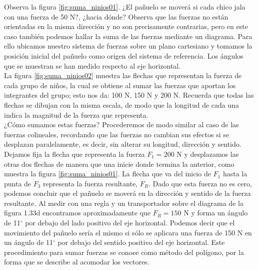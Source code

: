 \documentclass[11pt]{book}
\begin{document}
Observa la figura \ref{fig:suma_ninios01}. ¿El pañuelo se moverá si cada chico jala con una
fuerza de 50 N?, ¿hacia dónde? Observa que las fuerzas no están orientadas en la misma
dirección y no son precisamente contrarias, pero en este caso también podemos hallar
la suma de las fuerzas mediante un diagrama. Para ello ubicamos nuestro sistema de
fuerzas sobre un plano cartesiano y tomamos la posición inicial del pañuelo como
origen del sistema de referencia. Los ángulos que se muestran se han medido respecto
al eje horizontal.\\

La figura \ref{fig:suma_ninios02} muestra las flechas que representan la fuerza de cada
grupo de niños, la cual se obtiene al sumar las fuerzas que aportan los integrantes
del grupo; esto nos da: 100 N, 150 N y 200 N. Recuerda que todas las flechas se
dibujan con la misma escala, de modo que la longitud de cada una indica la magnitud
de la fuerza que representa.\\

¿Cómo sumamos estas fuerzas? Procederemos de modo similar al caso de las fuerzas
colineales, recordando que las fuerzas no cambian sus efectos si se desplazan
paralelamente, es decir, sin alterar su longitud, dirección y sentido.\\

Dejamos fija la flecha que representa la fuerza $F_1 = 200$ N y desplazamos las
otras dos flechas de manera que una inicie donde termina la anterior,
como muestra la figura \ref{fig:suma_ninios01}. La flecha que va del inicio
de $F_1$ hasta la punta de $F_3$ representa la fuerza resultante, $F_R$.
Dado que esta fuerza no es cero, podemos concluir que el pañuelo se moverá
en la dirección y sentido de la fuerza resultante. Al medir con una regla y
un transportador sobre el diagrama de la figura 1.33d encontramos
aproximadamente que $F_R = 150$ N y forma un ángulo de 11$^\circ$ por debajo
del lado positivo del eje horizontal. Podemos decir que el movimiento del
pañuelo sería el mismo si sólo se aplicara una fuerza de 150 N en un ángulo
de 11$^\circ$ por debajo del sentido positivo del eje horizontal. Este procedimiento
para sumar fuerzas se conoce como método del polígono, por la forma que
se describe al acomodar los vectores.

\newpage
\end{document}
